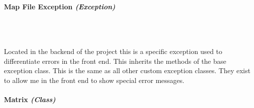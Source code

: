 \begin{FlushLeft}
    \paragraph{Map File Exception \textit{(Exception)}} \mbox{} \\

    \begin{figure}[H]
        \centering
    \end{figure}\\
    Located in the backend of the project this is a specific exception used to differentiate errors in the front end. This inherits the methods of the base exception class. This is the same as all other custom exception classes. They exist to allow me in the front end to show special error messages.
    \bk

    \paragraph{Matrix \textit{(Class)}} \mbox{} \\

    \begin{figure}[H]
        \centering
    \end{figure}\\


\end{FlushLeft}
